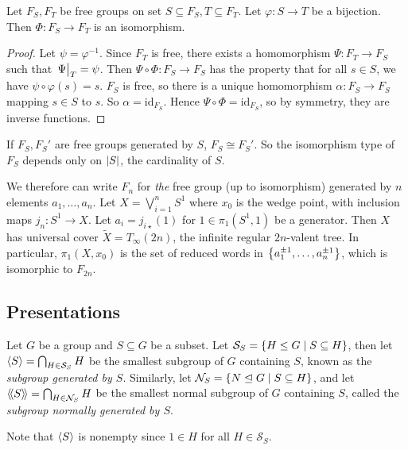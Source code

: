 \begin{lemma}
	Let \( F_S, F_T \) be free groups on set \( S \subseteq F_S, T \subseteq F_T \).
	Let \( \varphi \colon S \to T \) be a bijection.
	Then \( \Phi \colon F_S \to F_T \) is an isomorphism.
\end{lemma}
\begin{proof}
	Let \( \psi = \varphi^{-1} \).
	Since \( F_T \) is free, there exists a homomorphism \( \Psi \colon F_T \to F_S \) such that \( \eval{\Psi}_T = \psi \).
	Then \( \Psi \circ \Phi \colon F_S \to F_S \) has the property that for all \( s \in S \), we have \( \psi \circ \varphi(s) = s \).
	\( F_S \) is free, so there is a unique homomorphism \( \alpha \colon F_S \to F_S \) mapping \( s \in S \) to \( s \).
	So \( \alpha = \mathrm{id}_{F_S} \).
	Hence \( \Psi \circ \Phi = \mathrm{id}_{F_S} \), so by symmetry, they are inverse functions.
\end{proof}
\begin{corollary}
	If \( F_S, F_S' \) are free groups generated by \( S \), \( F_S \cong F_S' \).
	So the isomorphism type of \( F_S \) depends only on \( \abs{S} \), the cardinality of \( S \).
\end{corollary}
We therefore can write \( F_n \) for \emph{the} free group (up to isomorphism) generated by \( n \) elements \( a_1, \dots, a_n \).
Let \( X = \bigvee_{i=1}^n S^1 \) where \( x_0 \) is the wedge point, with inclusion maps \( j_n \colon S^1 \to X \).
Let \( a_i = j_{i\star}(1) \) for \( 1 \in \pi_1(S^1,1) \) be a generator.
Then \( X \) has universal cover \( \widetilde X = T_\infty(2n) \), the infinite regular \( 2n \)-valent tree.
In particular, \( \pi_1(X,x_0) \) is the set of reduced words in \( \qty{a_1^{\pm 1}, \dots, a_n^{\pm 1}} \), which is isomorphic to \( F_{2n} \).

\subsection{Presentations}
\begin{definition}
	Let \( G \) be a group and \( S \subseteq G \) be a subset.
	Let \( \mathcal S_S = \qty{H \leq G \mid S \subseteq H} \), then let \( \langle{} S \rangle = \bigcap_{H \in \mathcal S_S} H \) be the smallest subgroup of \( G \) containing \( S \), known as the \emph{subgroup generated by \( S \)}.
	Similarly, let \( \mathcal N_S = \qty{N \trianglelefteq G \mid S \subseteq H} \), and let \( \langle\!\langle{} S \rangle\!\rangle = \bigcap_{H \in \mathcal N_S} H \) be the smallest normal subgroup of \( G \) containing \( S \), called the \emph{subgroup normally generated by \( S \)}.
\end{definition}
Note that \( \langle{} S \rangle \) is nonempty since \( 1 \in H \) for all \( H \in \mathcal S_S \).

